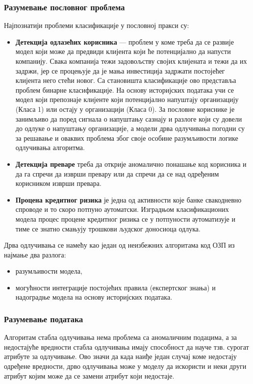 \subsubsection{Разумевање пословног проблема}
Најпознатији проблеми класификације у пословној пракси су:

\begin{itemize}
  \item \textbf{Детекција одлазећих корисника} — проблем у коме треба да се развије модел који може да предвиди клијента који ће потенцијално да напусти компанију. Свака компанија тежи задовољству својих клијената и тежи да их задржи, јер се процењује да је мања инвестиција задржати постојећег клијента него стећи новог. Са становишта класификације ово представља проблем бинарне класификације. На основу историјских података учи се модел који препознаје клијенте који потенцијално напуштају организацију (Класа 1) или остају у организацији (Класа 0). За пословне кориснике је занимљиво да поред сигнала о напуштању сазнају и разлоге који су довели до одлуке о напуштању организације, а модели дрва одлучивања погодни су за решавање и оваквих проблема због своје особине разумљивости логике одлучивања алгоритма.
  \item \textbf{Детекција преваре} треба да открије аномалично понашање код корисника и да га спречи да изврши превару или да спречи да се над одређеним корисником изврши превара.
  \item \textbf{Процена кредитног ризика} је једна од активности које банке свакодневно спроводе и то скоро потпуно аутоматски. Изградњом класификационих модела процес процене кредитног ризика се у потпуности аутоматизује и тиме се знатно смањују трошкови људског доносиоца одлука.
\end{itemize}
Дрва одлучивања се намећу као један од неизбежних алгоритама код ОЗП из најмање два разлога:

\begin{itemize}
  \item разумљивости модела,
  \item могућности интеграције постојећих правила (експертског знања) и надоградње модела на основу историјских података.
\end{itemize}

\subsubsection{Разумевање података}
Алгоритам стабла одлучивања нема проблема са аномаличним подацима, а за недостајуће вредности стабла одлучивања имају способност да науче тзв. сурогат атрибуте за одлучивање. Ово значи да када наиђе један случај коме недостају одређене вредности, дрво одлучивања може у моделу да искористи и неки други атрибут којим може да се замени атрибут који недостаје.

